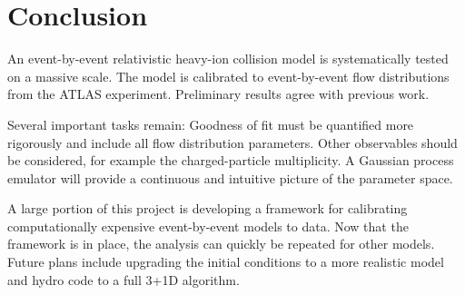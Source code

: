 \documentclass[reprint,amsmath]{revtex4-1}
\begin{document}
\section{Conclusion}

An event-by-event relativistic heavy-ion collision model is systematically tested on a massive scale.  The model is calibrated to
event-by-event flow distributions from the ATLAS experiment.  Preliminary results agree with previous work.

Several important tasks remain:  Goodness of fit must be quantified more rigorously and include all flow distribution parameters.
Other observables should be considered, for example the charged-particle multiplicity.   A Gaussian process emulator will provide
a continuous and intuitive picture of the parameter space.

A large portion of this project is developing a framework for calibrating computationally expensive event-by-event models to data.  Now
that the framework is in place, the analysis can quickly be repeated for other models.  Future plans include upgrading the initial
conditions to a more realistic model and hydro code to a full 3+1D algorithm.



\end{document}
